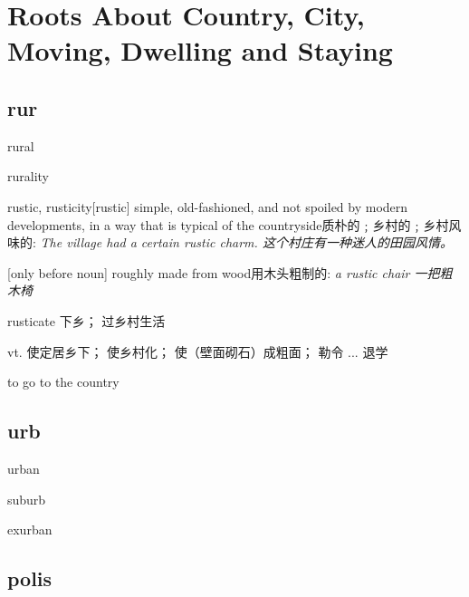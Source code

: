 \chapter{Roots  About Country, City, Moving, Dwelling and Staying}

\section{rur}

\begin{RefWord}{rural}
\end{RefWord}

\begin{RefWord}{rurality}
\end{RefWord}

\begin{RefWord}{rustic, rusticity}[rustic]
    simple, old-fashioned, and not spoiled by modern developments, in a way that is typical of the countryside质朴的﹔乡村的﹔乡村风味的:
    \textit{The village had a certain rustic charm. 这个村庄有一种迷人的田园风情。}

    [only before noun] roughly made from wood用木头粗制的:
    \textit{a rustic chair 一把粗木椅}
\end{RefWord}

\begin{RefWord}{rusticate}
    下乡； 过乡村生活 
    
    vt. 使定居乡下； 使乡村化； 使（壁面砌石）成粗面； 勒令 ... 退学

    to go to the country

\end{RefWord}




\section{urb}

\begin{RefWord}{urban}
\end{RefWord}

\begin{RefWord}{suburb}
\end{RefWord}

\begin{RefWord}{exurban}
\end{RefWord}

\section{polis}

